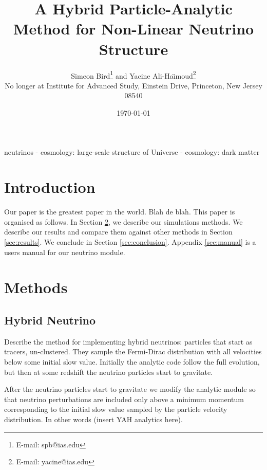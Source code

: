 \documentclass[useAMS, usenatbib]{mnras}
\title{A Hybrid Particle-Analytic Method for Non-Linear Neutrino Structure}
\author[ S. Bird and Y. Ali-Ha\"{\i}moud]{
  Simeon Bird\thanks{E-mail: spb@ias.edu} and Yacine Ali-Ha\"{\i}moud\thanks{E-mail: yacine@ias.edu}\vspace{1.5mm}\\
No longer at Institute for Advanced Study, Einstein Drive, Princeton, New Jersey 08540}
\begin{document}
\date{\today}

\pagerange{\pageref{firstpage}--\pageref{lastpage}} 
\label{firstpage}

\maketitle

\begin{abstract}
\end{abstract}

\begin{keywords}
        neutrinos - cosmology: large-scale structure of Universe - cosmology: dark matter
\end{keywords}

\section{Introduction}

Our paper is the greatest paper in the world. Blah de blah.
This paper is organised as follows. In Section \ref{sec:methods},
we describe our simulations methods. We describe our
results and compare them against other methods
in Section \ref{sec:results}. We conclude in Section \ref{sec:conclusion}.
Appendix \ref{sec:manual} is a users manual for our neutrino module.
\cite{AHB}

\section{Methods}
\label{sec:methods}


\subsection{Hybrid Neutrino}
\label{sec:hybrid}

Describe the method for implementing hybrid neutrinos:
particles that start as tracers, un-clustered. They sample
the Fermi-Dirac distribution with all velocities below some
initial slow value. Initially the analytic code follow the full evolution,
but then at some redshift the neutrino particles start to gravitate.

After the neutrino particles start to gravitate we modify the
analytic module so that neutrino perturbations are included only above a
minimum momentum corresponding to the initial slow value sampled by the
particle velocity distribution. In other words (insert YAH analytics here).
\end{document}
